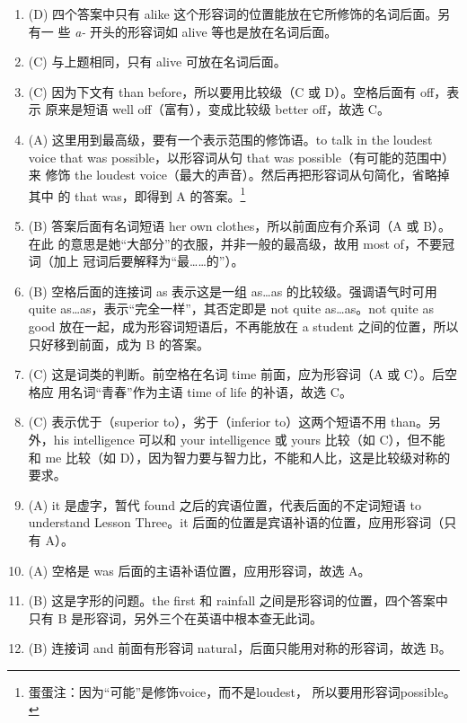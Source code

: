 \documentclass{yufa}
\begin{document}
\begin{enumerate}
\item (D) 四个答案中只有 alike 这个形容词的位置能放在它所修饰的名词后面。另有一
  些 \emph{a-} 开头的形容词如 alive 等也是放在名词后面。
\item  (C) 与上题相同，只有 alive 可放在名词后面。
\item (C) 因为下文有 than before，所以要用比较级（C 或 D）。空格后面有 off，表示
  原来是短语 well off（富有），变成比较级 better off，故选 C。
\item (A) 这里用到最高级，要有一个表示范围的修饰语。to talk in the loudest
  voice that was possible，以形容词从句 that was possible（有可能的范围中）来
  修饰 the loudest voice（最大的声音）。然后再把形容词从句简化，省略掉其中
  的 that was，即得到 A 的答案。\footnote{蛋蛋注：因为“可能”是修饰voice，而不是loudest，
    所以要用形容词possible。}
\item (B) 答案后面有名词短语 her own clothes，所以前面应有介系词（A 或 B）。在此
  的意思是她“大部分”的衣服，并非一般的最高级，故用 most of，不要冠词（加上
  冠词后要解释为“最……的”）。
\item (B) 空格后面的连接词 as 表示这是一组 as…as 的比较级。强调语气时可用 quite as…as，表示“完全一样”，其否定即是 not quite as…as。not quite as good 放在一起，成为形容词短语后，不再能放在 a student 之间的位置，所以只好移到前面，成为 B 的答案。

\item (C) 这是词类的判断。前空格在名词 time 前面，应为形容词（A 或 C）。后空格应
  用名词“青春”作为主语 time of life 的补语，故选 C。

\item (C) 表示优于（superior to），劣于（inferior to）这两个短语不用 than。另
  外，his intelligence 可以和 your intelligence 或 yours 比较（如 C），但不能
  和 me 比较（如 D），因为智力要与智力比，不能和人比，这是比较级对称的要求。

\item (A) it 是虚字，暂代 found 之后的宾语位置，代表后面的不定词短语 to understand Lesson Three。it 后面的位置是宾语补语的位置，应用形容词（只有 A）。
\item (A) 空格是 was 后面的主语补语位置，应用形容词，故选 A。

\item  (B) 这是字形的问题。the first 和 rainfall 之间是形容词的位置，四个答案中只有 B 是形容词，另外三个在英语中根本查无此词。

\item  (B) 连接词 and 前面有形容词 natural，后面只能用对称的形容词，故选 B。


\end{enumerate}
\end{document}
